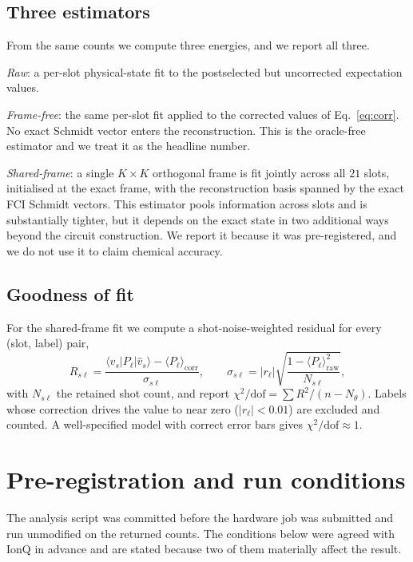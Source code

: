 \documentclass[aps,prx,twocolumn,superscriptaddress,nofootinbib,floatfix]{revtex4-2}
\begin{document}
\subsection{Three estimators}

From the same counts we compute three energies, and we report all three.

\emph{Raw}: a per-slot physical-state fit to the postselected but
uncorrected expectation values.

\emph{Frame-free}: the same per-slot fit applied to the corrected values
of Eq.~\eqref{eq:corr}. No exact Schmidt vector enters the
reconstruction. This is the oracle-free estimator and we treat it as the
headline number.

\emph{Shared-frame}: a single $K\times K$ orthogonal frame is fit jointly
across all $21$ slots, initialised at the exact frame, with the
reconstruction basis spanned by the exact FCI Schmidt vectors. This
estimator pools information across slots and is substantially tighter,
but it depends on the exact state in two additional ways beyond the
circuit construction. We report it because it was pre-registered, and we
do not use it to claim chemical accuracy.

\subsection{Goodness of fit}

For the shared-frame fit we compute a shot-noise-weighted residual for
every (slot, label) pair,
\begin{equation}
R_{s\ell} = \frac{\langle \hat v_s | P_\ell | \hat v_s\rangle
- \langle P_\ell\rangle_{\mathrm{corr}}}{\sigma_{s\ell}},
\qquad
\sigma_{s\ell} = |r_\ell|\sqrt{\frac{1-\langle P_\ell\rangle^2_{\mathrm{raw}}}{N_{s\ell}}},
\end{equation}
with $N_{s\ell}$ the retained shot count, and report
$\chi^2/\mathrm{dof} = \sum R^2 / (n - N_\theta)$. Labels whose correction
drives the value to near zero ($|r_\ell| < 0.01$) are excluded and counted.
A well-specified model with correct error bars gives
$\chi^2/\mathrm{dof}\approx1$.

\section{Pre-registration and run conditions}

The analysis script was committed before the hardware job was submitted
and run unmodified on the returned counts. The conditions below were
agreed with IonQ in advance and are stated because two of them materially
affect the result.
\end{document}
